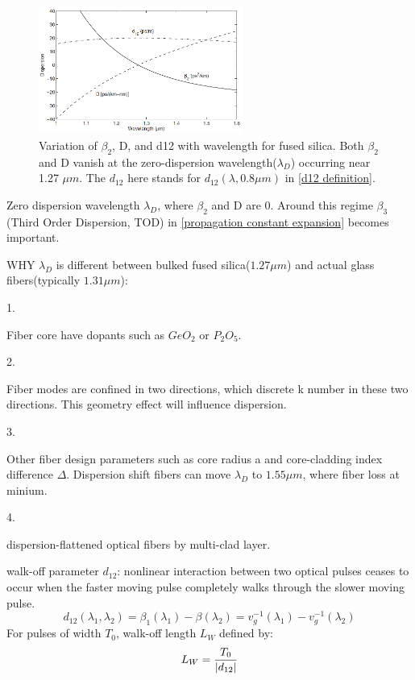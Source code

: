 \documentclass[12pt]{extarticle}
\numberwithin{equation}{section}
\numberwithin{figure}{section}
\numberwithin{table}{section}
\newcommand{\<}{\langle}
\renewcommand{\>}{\rangle}
\theoremstyle{definition}
\newcommand{\SubItem}[1]{
    {\setlength\itemindent{15pt} \item[-] #1}
}
\begin{document}
\begin{itemize}
                    \begin{figure}[htbp]
                        \centering
                        \includegraphics[width=0.6\textwidth]{images/fig1.5.PNG}
                        \caption{Variation of $\beta_2$, D, and d12 with wavelength for fused silica. Both $\beta_2$ and D vanish at the zero-dispersion wavelength($\lambda_D$) occurring near 1.27 $\mu m$. The $d_{12}$ here stands for $d_{12}(\lambda, 0.8\mu m)$ in \autoref{d12 definition}.}
                        \label{fig1.5}
                    \end{figure}
                    
                \item Zero dispersion wavelength $\lambda_D$, where $\beta_2$ and D are 0. Around this regime $\beta_3$ (Third Order Dispersion, TOD) in \autoref{propagation constant expansion} becomes important. 
                
                \item WHY $\lambda_D$ is different between bulked fused silica($1.27\mu m$) and actual glass fibers(typically $1.31\mu m$):
                    \SubItem{1.} Fiber core have dopants such as $GeO_2$ or $P_2O_5$.
                    \SubItem{2.} Fiber modes are confined in two directions, which discrete k number in these two directions. This geometry effect will influence dispersion.
                    \SubItem{3.} Other fiber design parameters such as core radius a and core-cladding index difference $\Delta$. Dispersion shift fibers can move $\lambda_D$ to $1.55\mu m$, where fiber loss at minium.
                    \SubItem{4.} dispersion-flattened optical fibers by multi-clad layer.
                    
                \item walk-off parameter $d_{12}$: nonlinear interaction between two optical pulses ceases
                to occur when the faster moving pulse completely walks through the slower moving pulse.
                    \begin{equation}
                        d_{12}(\lambda_1,\lambda_2) = \beta_1(\lambda_1)-\beta(\lambda_2) = v_g^{-1}(\lambda_1)-v_g^{-1}(\lambda_2)
                        \label{d12 definition}
                    \end{equation}
                    For pulses of width $T_0$, walk-off length $L_W$ defined by:
                    \begin{equation}
                        L_W = \frac{T_0}{\abs{d_{12}}}
                        \label{LW definition}
                    \end{equation}
            \end{itemize}
        
\end{document}
